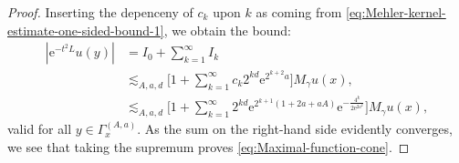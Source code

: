 \documentclass{amsart}
\theoremstyle{remark}
\newcommand{\e}{\mathrm{e}} %
\begin{document}
\begin{proof}
  Inserting the depenceny of $c_k$ upon $k$ as coming from
  \eqref{eq:Mehler-kernel-estimate-one-sided-bound-1}, we obtain the bound:
  \begin{align*}
    |\e^{-t^2 L} u(y)| &= I_0 + \sum_{k = 1}^\infty I_k\\
    &\lesssim_{A, a, d} \biggl[1 + \sum_{k =  1}^\infty c_k
      2^{k d} \e^{2^{k + 2}a} \biggr] M_\gamma u(x),\\
    &\lesssim_{A, a, d} \biggl[1 + \sum_{k = 1}^\infty 2^{k
        d} \e^{2^{k + 1} (1 + 2a + aA)} \e^{-\frac{4^k}{2 \e^{2 a^2}}} \biggr]
    M_\gamma u(x),
  \end{align*}
  valid for all $y \in \Gamma_x^{(A, a)}$. As the sum on the right-hand side
  evidently converges, we see that taking the supremum proves
  \eqref{eq:Maximal-function-cone}.
\end{proof}



\end{document}
